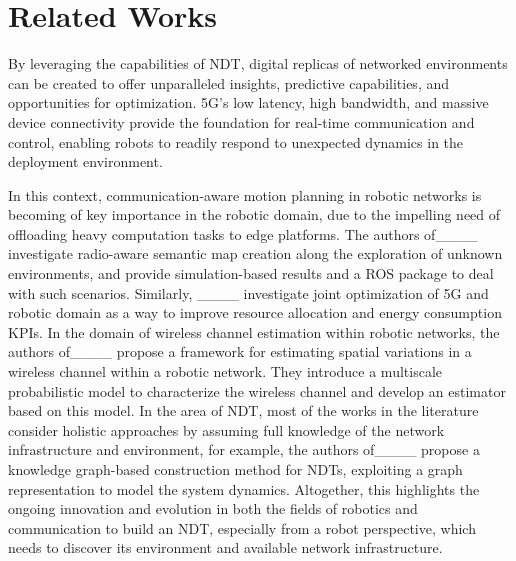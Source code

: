 \section{Related Works}
\label{sec:related}

By leveraging the capabilities of NDT, digital replicas of networked environments can be created to offer unparalleled insights, predictive capabilities, and opportunities for optimization. 5G's low latency, high bandwidth, and massive device connectivity provide the foundation for real-time communication and control, enabling robots to readily respond to unexpected dynamics in the deployment environment. 

In this context, communication-aware motion planning in robotic networks is becoming of key importance in the robotic domain, due to the impelling need of offloading heavy computation tasks to edge platforms. 
The authors of____ investigate radio-aware semantic map creation along the exploration of unknown environments, and provide simulation-based results and a ROS package to deal with such scenarios. Similarly, ____ investigate joint optimization of 5G and robotic domain as a way to improve resource allocation and energy consumption KPIs. %
In the domain of wireless channel estimation within robotic networks, the authors of____ propose a framework for estimating spatial variations in a wireless channel within a robotic network. They introduce a multiscale probabilistic model to characterize the wireless channel and develop an estimator based on this model.
In the area of NDT, most of the works in the literature consider holistic approaches by assuming full knowledge of the network infrastructure and environment, for example, the authors of____ propose a knowledge graph-based construction method for NDTs, exploiting a graph representation to model the system dynamics. %
Altogether, this highlights the ongoing innovation and evolution in both the fields of robotics and communication to build an NDT, especially from a robot perspective, which needs to discover its environment and available network infrastructure. %

